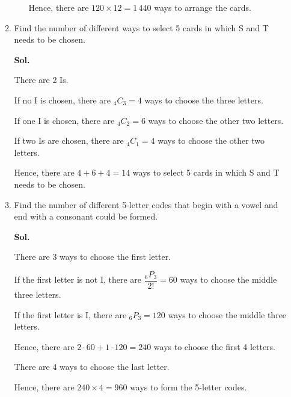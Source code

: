 \documentclass{report}
\newcommand\permtwo[2][^n]{{}_{#1}P_{#2}}
\newcommand\comb[2][^n]{{}_{#1}C_{#2}}
\newcommand{\sol}[1]{

      \noindent \textbf{Sol.}
}
\def\eos{\quad\hbox{\rlap{\hbox{\vrule depth 1.5pt height 2.6mm width 0.2mm \hskip 1mm \vrule height 2.6mm width 0.2mm}}{\vbox{\hrule height 0.2mm width 1.4mm \vskip 2.8mm \hrule depth 1.5pt height -0.35mm width 1.2mm}}}}
\begin{document}
\begin{multicols*}{2}
\begin{enumerate}
\begin{enumerate}
\begin{enumerate}
                                          Hence, there are $120 \times 12 = 1\,440$ ways to arrange the cards. $\eos$
                              \end{enumerate}

                        \item Find the number of different ways to select 5 cards in which S and T needs to
                              be chosen. \sol{}

                              There are 2 Is.

                              If no I is chosen, there are $\comb[4]{3} = 4$ ways to choose the three
                              letters.

                              If one I is chosen, there are $\comb[4]{2} = 6$ ways to choose the other two
                              letters.

                              If two Is are chosen, there are $\comb[4]{1} = 4$ ways to choose the other two
                              letters.

                              Hence, there are $4 + 6 + 4 = 14$ ways to select 5 cards in which S and T needs
                              to be chosen. $\eos$

                        \item Find the number of different 5-letter codes that begin with a vowel and end
                              with a consonant could be formed. \sol{}

                              There are 3 ways to choose the first letter.

                              If the first letter is not I, there are $\dfrac{\permtwo[6]{3}}{2!} = 60$ ways
                              to choose the middle three letters.

                              If the first letter is I, there are $\permtwo[6]{3} = 120$ ways to choose the
                              middle three letters.

                              Hence, there are $2\cdot 60 + 1\cdot 120 = 240$ ways to choose the first 4
                              letters.

                              There are 4 ways to choose the last letter.

                              Hence, there are $240 \times 4 = 960$ ways to form the 5-letter codes. $\eos$
                  \end{enumerate}


\end{enumerate}
\end{multicols*}
\end{document}
